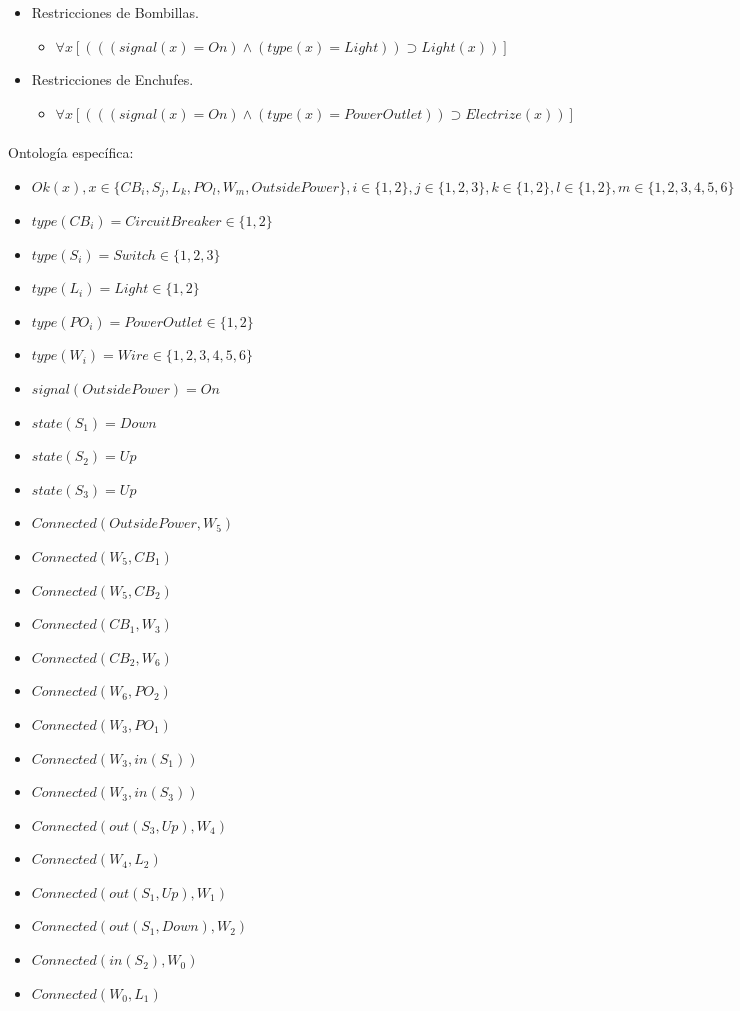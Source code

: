 \documentclass[10pt, a4paper,spanish]{article}
\begin{document}
\begin{itemize}
			\item Restricciones de Bombillas.
			\begin{itemize}
				\item$ \forall x [(((signal(x) = On) \land (type(x) = Light) )  \supset Light(x))] $
			\end{itemize}

			\item Restricciones de Enchufes.
			\begin{itemize}
				\item$ \forall x [(((signal(x) = On) \land (type(x) = PowerOutlet) )  \supset Electrize(x))] $
			\end{itemize}
		\end{itemize}




		\paragraph{}
		Ontología específica:

		\begin{itemize}
			\item $ Ok(x),  x \in \{CB_i, S_j, L_k, PO_l, W_m, OutsidePower\}, i \in \{1,2\}, j \in \{1,2,3\},k \in \{1,2\},l \in \{1,2\},m \in \{1,2,3,4,5,6\}$
			\item $ type(CB_i) = CircuitBreaker \in \{1,2\} $
			\item $ type(S_i) = Switch \in \{1,2, 3\} $
			\item $ type(L_i) = Light \in \{1,2\} $
			\item $ type(PO_i) = PowerOutlet \in \{1,2\} $
			\item $ type(W_i) = Wire \in \{1,2, 3, 4, 5, 6\} $
			\item $ signal(OutsidePower) = On $
			\item $ state(S_1) = Down $
			\item $ state(S_2) = Up $
			\item $ state(S_3) = Up $
			\item $ Connected(OutsidePower, W_5)$
			\item $ Connected(W_5, CB_1)$
			\item $ Connected(W_5, CB_2)$
			\item $ Connected(CB_1, W_3)$
			\item $ Connected(CB_2, W_6)$
			\item $ Connected(W_6, PO_2)$
			\item $ Connected(W_3, PO_1)$
			\item $ Connected(W_3, in(S_1))$
			\item $ Connected(W_3, in(S_3))$
			\item $ Connected(out(S_3, Up), W_4)$
			\item $ Connected(W_4, L_2)$
			\item $ Connected(out(S_1, Up), W_1)$
			\item $ Connected(out(S_1, Down), W_2)$
			\item $ Connected(in(S_2), W_0)$
			\item $ Connected(W_0, L_1)$
		\end{itemize}
\end{document}
